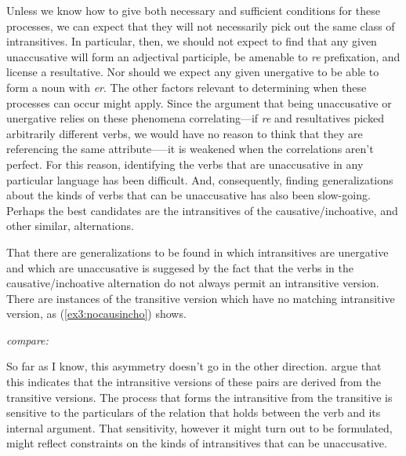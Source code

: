 Unless we know how to give both necessary and sufficient conditions for these processes, we can expect that they will not necessarily pick out the same class of intransitives. In particular, then, we should not expect to find that any given unaccusative will form an adjectival participle, be amenable to \textit{re} prefixation, and license a resultative. Nor should we expect any given unergative to be able to form a noun with \textit{er}. The other factors relevant to determining when these processes can occur might apply. Since the argument that being unaccusative or unergative relies on these phenomena correlating---if \textit{re} and resultatives picked arbitrarily different verbs, we would have no reason to think that they are referencing the same attribute—--it is weakened when the correlations aren't perfect. For this reason, identifying the verbs that are unaccusative in any particular language has been difficult. And, consequently, finding generalizations about the kinds of verbs that can be unaccusative has also been slow-going. Perhaps the best candidates are the intransitives of the causative/inchoative, and other similar, alternations. 

That there are generalizations to be found in which intransitives are unergative and which are unaccusative is suggesed by the fact that the verbs in the causative/inchoative alternation do not always permit an intransitive version. There are instances of the transitive version which have no matching intransitive version, as (\ref{ex3:nocausincho}) shows.
\begin{exe}
\raggedright
	\ex \label{ex3:nocausincho}
	\begin{xlist}
		\sn \textit{compare:}
	\end{xlist}
	\hfill \citep[(9), (11)-(13):~85-6]{Levin:1995}\hfill\hspace*{.15in}
\end{exe}
So far as I know, this asymmetry doesn't go in the other direction. \citet{Levin:1995} argue that this indicates that the intransitive versions of these pairs are derived from the transitive versions. The process that forms the intransitive from the transitive is sensitive to the particulars of the relation that holds between the verb and its internal argument. That sensitivity, however it might turn out to be formulated, might reflect constraints on the kinds of intransitives that can be unaccusative.

